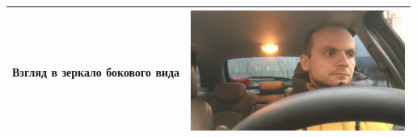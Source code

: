 \begin{tabular}{|l|l|}
    \hline
    Взгляд в зеркало бокового вида & \includegraphics[width=7cm]{6.png} \\    
    \hline
\end{tabular}